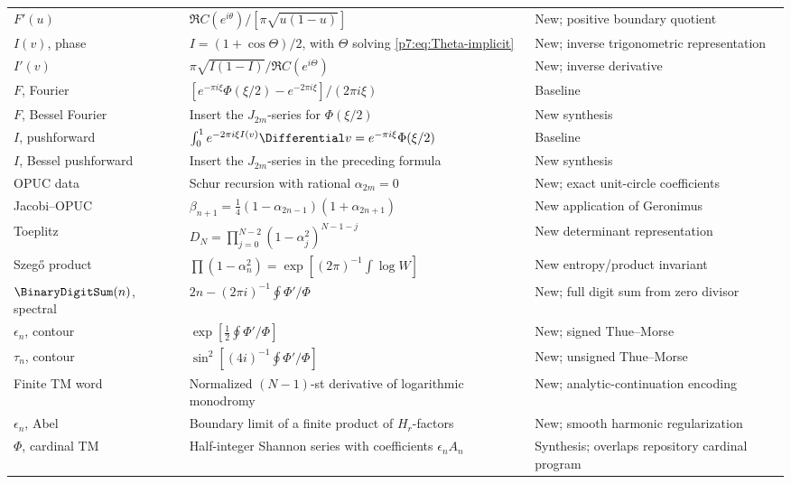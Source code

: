 \documentclass[11pt]{article}
\theoremstyle{definition}
\theoremstyle{remark}
\begin{document}
\begin{longtable}{p{}p{}p{}}
\(F'(u)\) &
\(\Re C(e^{i\theta})/[\pi\sqrt{u(1-u)}]\) &
New; positive boundary quotient\\

\(I(v)\), phase &
\(I=(1+\cos\Theta)/2\), with \(\Theta\) solving \eqref{p7:eq:Theta-implicit} &
New; inverse trigonometric representation\\

\(I'(v)\) &
\(\pi\sqrt{I(1-I)}/\Re C(e^{i\Theta})\) &
New; inverse derivative\\

\(F\), Fourier &
\([e^{-\pi i\xi}\Phi(\xi/2)-e^{-2\pi i\xi}]/(2\pi i\xi)\) &
Baseline\\

\(F\), Bessel Fourier &
Insert the \(J_{2m}\)-series for \(\Phi(\xi/2)\) &
New synthesis\\

\(I\), pushforward &
\(\int_0^1e^{-2\pi i\xi I(v)}\Differential v=e^{-\pi i\xi}\Phi(\xi/2)\) &
Baseline\\

\(I\), Bessel pushforward &
Insert the \(J_{2m}\)-series in the preceding formula &
New synthesis\\

OPUC data &
Schur recursion with rational \(\alpha_{2m}=0\) &
New; exact unit-circle coefficients\\

Jacobi--OPUC &
\(\beta_{n+1}=\tfrac14(1-\alpha_{2n-1})(1+\alpha_{2n+1})\) &
New application of Geronimus\\

Toeplitz &
\(D_N=\prod_{j=0}^{N-2}(1-\alpha_j^2)^{N-1-j}\) &
New determinant representation\\

Szeg\H{o} product &
\(\prod(1-\alpha_n^2)=\exp[(2\pi)^{-1}\int\log W]\) &
New entropy/product invariant\\

\(\BinaryDigitSum(n)\), spectral &
\(2n-(2\pi i)^{-1}\oint\Phi'/\Phi\) &
New; full digit sum from zero divisor\\

\(\epsilon_n\), contour &
\(\exp[\tfrac12\oint\Phi'/\Phi]\) &
New; signed Thue--Morse\\

\(\tau_n\), contour &
\(\sin^2[(4i)^{-1}\oint\Phi'/\Phi]\) &
New; unsigned Thue--Morse\\

Finite TM word &
Normalized \((N-1)\)-st derivative of logarithmic monodromy &
New; analytic-continuation encoding\\

\(\epsilon_n\), Abel &
Boundary limit of a finite product of \(H_r\)-factors &
New; smooth harmonic regularization\\

\(\Phi\), cardinal TM &
Half-integer Shannon series with coefficients \(\epsilon_nA_n\) &
Synthesis; overlaps repository cardinal program\\
\end{longtable}
\normalsize
\end{document}
